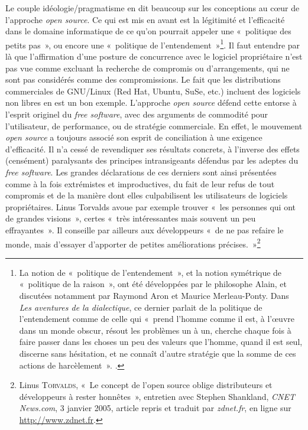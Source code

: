 \documentclass{FramateX}
\begin{document}
\begin{refsection}
Le couple idéologie/pragmatisme en dit beaucoup sur les conceptions au
cœur de l'approche \textit{open source}. Ce qui est mis en avant est la
légitimité et l'efficacité dans le domaine informatique de ce qu'on
pourrait appeler une «~politique des petits pas~», ou encore une
«~politique de l'entendement~»\footnote{La notion de «~politique de
l'entendement~», et la notion symétrique de «~politique de la raison~»,
ont été développées par le philosophe Alain, et discutées notamment par
Raymond Aron et Maurice Merleau-Ponty. Dans \textit{Les aventures de la
dialectique}, ce dernier parlait de la politique de l'entendement comme
de celle qui «~prend l'homme comme il est, à l'œuvre dans un monde
obscur, résout les problèmes un à un, cherche chaque fois à faire
passer dans les choses un peu des valeurs que l'homme, quand il est
seul, discerne sans hésitation, et ne connaît d'autre stratégie que la
somme de ces actions de harcèlement~». \cite[p.~10]{merleau-pontyles1955}.}. Il faut entendre par là que l'affirmation d'une posture de
concurrence avec le logiciel propriétaire n'est pas vue comme excluant
la recherche de compromis ou d'arrangements, qui ne sont pas considérés
comme des compromissions. Le fait que les distributions commerciales de
GNU/Linux (Red Hat, Ubuntu, SuSe, etc.) incluent des logiciels non
libres en est un bon exemple. L'approche \textit{open source} défend cette entorse à l'esprit originel du \textit{free software}, avec des
arguments de commodité pour l'utilisateur, de performance, ou de
stratégie commerciale. En effet, le mouvement \textit{open source} a
toujours associé son esprit de conciliation à une exigence
d'efficacité. Il n'a cessé de
revendiquer ses résultats concrets, à l'inverse des effets (censément)
paralysants des principes intransigeants défendus par les adeptes du
\textit{free software}. Les grandes déclarations de ces derniers sont
ainsi présentées comme à la fois extrémistes et improductives, du fait
de leur refus de tout compromis et de la manière dont elles
culpabilisent les utilisateurs de logiciels propriétaires. Linus
Torvalds avoue par exemple trouver «~les personnes qui ont de grandes
visions~», certes «~très intéressantes mais souvent un peu
effrayantes~». Il conseille par ailleurs aux développeurs «~de ne pas refaire le monde, mais d'essayer d'apporter de petites améliorations précises.~»\footnote{Linus \textsc{Torvalds}, «~Le concept de l'open source oblige distributeurs et développeurs à rester honnêtes~», entretien
avec Stephen Shankland, \textit{CNET News.com}, 3 janvier 2005, article
repris et traduit par \textit{zdnet.fr}, en ligne sur \url{http://www.zdnet.fr}.}


\end{refsection}
\end{document}
